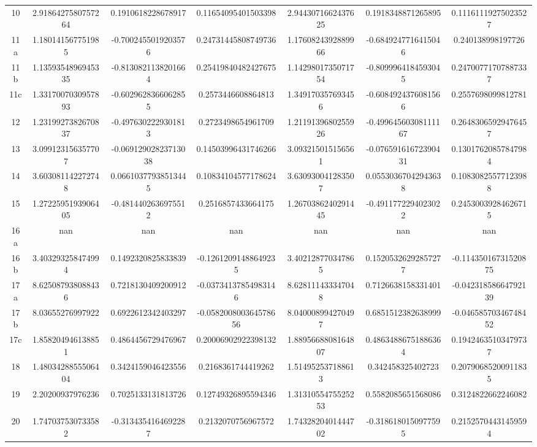 \begin{table}
\begin{tabular}{ccccccc}
10 & 2.9186427580757264 & 0.1910618228678917 & 0.11654095401503398 & 2.9443071662437625 & 0.1918348871265895 & 0.11161119275023527 \\
11a & 1.180141567751985 & -0.7002455019203576 & 0.24731445808749736 & 1.1760824392889966 & -0.6849247716415046 & 0.240138998197726 \\
11b & 1.1359354896945335 & -0.8130821138201664 & 0.25419840482427675 & 1.1429801735071754 & -0.8099964184593045 & 0.24700771707887337 \\
11c & 1.3317007030957893 & -0.6029628366062855 & 0.2573446608864813 & 1.349170357693456 & -0.6084924376081566 & 0.2557698099812781 \\
12 & 1.2319927382670837 & -0.4976302229301813 & 0.2723498654961709 & 1.2119139680255926 & -0.49964560308111167 & 0.26483065929476457 \\
13 & 3.099123156357707 & -0.06912902823713038 & 0.14503996431746266 & 3.093215015156561 & -0.07659161672390431 & 0.13017620857847984 \\
14 & 3.603081142272748 & 0.06610377938513445 & 0.10834104577178624 & 3.630930041283507 & 0.05530367042943638 & 0.10830825577123988 \\
15 & 1.2722595193906405 & -0.4814402636975512 & 0.2516857433664175 & 1.2670386240291445 & -0.4911772294023022 & 0.24530039284626715 \\
16a & nan & nan & nan & nan & nan & nan \\
16b & 3.403293258474994 & 0.1492320825833839 & -0.12612091488649235 & 3.402128770347865 & 0.15205326292857277 & -0.11435016731520875 \\
17a & 8.625087938088436 & 0.7218130409200912 & -0.03734137854983146 & 8.628111433347048 & 0.7126638158331401 & -0.04231858664792139 \\
17b & 8.03655276997922 & 0.6922612342403297 & -0.058200800364578656 & 8.040008994270497 & 0.6851512382638999 & -0.04658570346748452 \\
17c & 1.858204946138851 & 0.4864456729476967 & 0.20006902922398132 & 1.8895668808164807 & 0.48634886751886364 & 0.19424635103479737 \\
18 & 1.4803428855506404 & 0.3424159046423556 & 0.2168361744419262 & 1.514952537188613 & 0.342458325402723 & 0.20790685200911835 \\
19 & 2.20200937976236 & 0.7025133131813726 & 0.12749326895594346 & 1.3131055475525253 & 0.5582085651568086 & 0.3124822662246082 \\
20 & 1.747037530733582 & -0.3134354164692287 & 0.2132070756967572 & 1.7432820401444702 & -0.3186180150977595 & 0.21525704431459594 \\

\end{tabular}
\end{table}
